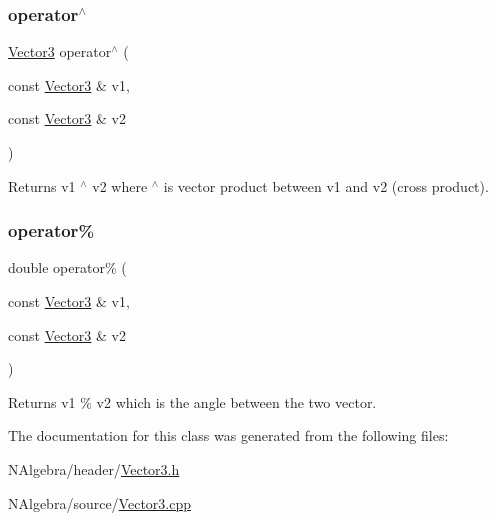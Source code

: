 \subsubsection{\texorpdfstring{operator$^\wedge$}{operator^}}
{\footnotesize\ttfamily \mbox{\hyperlink{class_vector3}{Vector3}} operator$^\wedge$ (\begin{DoxyParamCaption}\item[{const \mbox{\hyperlink{class_vector3}{Vector3}} \&}]{v1,  }\item[{const \mbox{\hyperlink{class_vector3}{Vector3}} \&}]{v2 }\end{DoxyParamCaption})\hspace{0.3cm}{\ttfamily [friend]}}

\begin{DoxyReturn}{Returns}
v1 $^\wedge$ v2 where $^\wedge$ is vector product between v1 and v2 (cross product). 
\end{DoxyReturn}
\mbox{\label{class_vector3_a3ec8a9ae24e8b79b7d6c360af8d9ad38}} 
\subsubsection{\texorpdfstring{operator\%}{operator\%}}
{\footnotesize\ttfamily double operator\% (\begin{DoxyParamCaption}\item[{const \mbox{\hyperlink{class_vector3}{Vector3}} \&}]{v1,  }\item[{const \mbox{\hyperlink{class_vector3}{Vector3}} \&}]{v2 }\end{DoxyParamCaption})\hspace{0.3cm}{\ttfamily [friend]}}

\begin{DoxyReturn}{Returns}
v1 \% v2 which is the angle between the two vector. 
\end{DoxyReturn}


The documentation for this class was generated from the following files\+:\begin{DoxyCompactItemize}
\item 
N\+Algebra/header/\mbox{\hyperlink{_vector3_8h}{Vector3.\+h}}\item 
N\+Algebra/source/\mbox{\hyperlink{_vector3_8cpp}{Vector3.\+cpp}}\end{DoxyCompactItemize}
